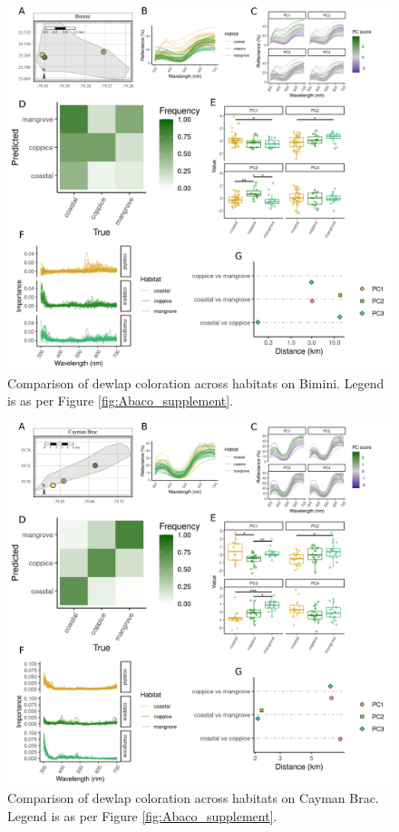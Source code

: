 \begin{figure}[H]
	\centering
	\includegraphics[width=\textwidth]{figures/Bimini_supplement.png}
	\caption{Comparison of dewlap coloration across habitats on Bimini. Legend is as per Figure \ref{fig:Abaco_supplement}.}
	\label{fig:Bimini}
\end{figure}

\pagebreak

\begin{figure}[H]
	\centering
	\includegraphics[width=\textwidth]{figures/CaymanBrac_supplement.png}
	\caption{Comparison of dewlap coloration across habitats on Cayman Brac. Legend is as per Figure \ref{fig:Abaco_supplement}.}
	\label{fig:CaymanBrac}
\end{figure}

